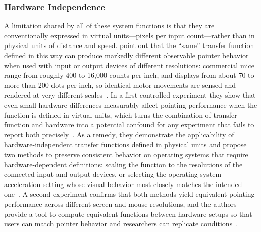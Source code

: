 \subsubsection{Hardware Independence}

A limitation shared by all of these system functions is that they are conventionally expressed in virtual units---pixels per input count---rather than in physical units of distance and speed. \citeauthor{hanada2021relevance} point out that the ``same'' transfer function defined in this way can produce markedly different observable pointer behavior when used with input or output devices of different resolutions: commercial mice range from roughly 400 to 16{,}000 counts per inch, and displays from about 70 to more than 200 dots per inch, so identical motor movements are sensed and rendered at very different scales~\cite{hanada2021relevance}. In a first controlled experiment they show that even small hardware differences measurably affect pointing performance when the function is defined in virtual units, which turns the combination of transfer function and hardware into a potential confound for any experiment that fails to report both precisely~\cite{hanada2021relevance}. As a remedy, they demonstrate the applicability of hardware-independent transfer functions defined in physical units and propose two methods to preserve consistent behavior on operating systems that require hardware-dependent definitions: scaling the function to the resolutions of the connected input and output devices, or selecting the operating-system acceleration setting whose visual behavior most closely matches the intended one~\cite{hanada2021relevance}. A second experiment confirms that both methods yield equivalent pointing performance across different screen and mouse resolutions, and the authors provide a tool to compute equivalent functions between hardware setups so that users can match pointer behavior and researchers can replicate conditions~\cite{hanada2021relevance}.

